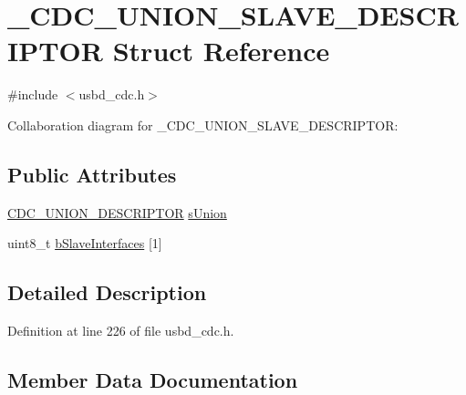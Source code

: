 \hypertarget{struct___c_d_c___u_n_i_o_n__1_s_l_a_v_e___d_e_s_c_r_i_p_t_o_r}{}\section{\+\_\+\+C\+D\+C\+\_\+\+U\+N\+I\+O\+N\+\_\+S\+L\+A\+V\+E\+\_\+\+D\+E\+S\+C\+R\+I\+P\+T\+OR Struct Reference}
\label{struct___c_d_c___u_n_i_o_n__1_s_l_a_v_e___d_e_s_c_r_i_p_t_o_r}


{\ttfamily \#include $<$usbd\+\_\+cdc.\+h$>$}



Collaboration diagram for \+\_\+\+C\+D\+C\+\_\+\+U\+N\+I\+O\+N\+\_\+S\+L\+A\+V\+E\+\_\+\+D\+E\+S\+C\+R\+I\+P\+T\+OR\+:
\subsection*{Public Attributes}
\begin{DoxyCompactItemize}
\item 
\hyperlink{usbd__cdc_8h_abae3cc6753424f8383c5d46f674975b9}{C\+D\+C\+\_\+\+U\+N\+I\+O\+N\+\_\+\+D\+E\+S\+C\+R\+I\+P\+T\+OR} \hyperlink{struct___c_d_c___u_n_i_o_n__1_s_l_a_v_e___d_e_s_c_r_i_p_t_o_r_a80ee9f0210ba596bfbeef771955c26a6}{s\+Union}
\item 
uint8\+\_\+t \hyperlink{struct___c_d_c___u_n_i_o_n__1_s_l_a_v_e___d_e_s_c_r_i_p_t_o_r_a4a4b8383cd96d9ba6fa83b35bb32c94b}{b\+Slave\+Interfaces} \mbox{[}1\mbox{]}
\end{DoxyCompactItemize}


\subsection{Detailed Description}


Definition at line 226 of file usbd\+\_\+cdc.\+h.



\subsection{Member Data Documentation}
\mbox{\label{struct___c_d_c___u_n_i_o_n__1_s_l_a_v_e___d_e_s_c_r_i_p_t_o_r_a4a4b8383cd96d9ba6fa83b35bb32c94b}} 
